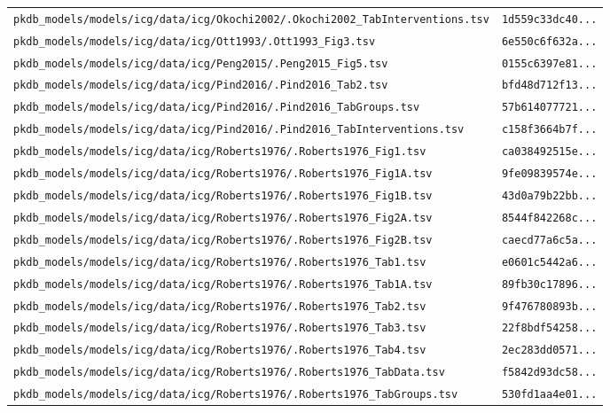 \begin{longtable}{ll}
\texttt{pkdb\_models/models/icg/data/icg/Okochi2002/.Okochi2002\_TabInterventions.tsv} & \texttt{1d559c33dc40...} \\
\texttt{pkdb\_models/models/icg/data/icg/Ott1993/.Ott1993\_Fig3.tsv} & \texttt{6e550c6f632a...} \\
\texttt{pkdb\_models/models/icg/data/icg/Peng2015/.Peng2015\_Fig5.tsv} & \texttt{0155c6397e81...} \\
\texttt{pkdb\_models/models/icg/data/icg/Pind2016/.Pind2016\_Tab2.tsv} & \texttt{bfd48d712f13...} \\
\texttt{pkdb\_models/models/icg/data/icg/Pind2016/.Pind2016\_TabGroups.tsv} & \texttt{57b614077721...} \\
\texttt{pkdb\_models/models/icg/data/icg/Pind2016/.Pind2016\_TabInterventions.tsv} & \texttt{c158f3664b7f...} \\
\texttt{pkdb\_models/models/icg/data/icg/Roberts1976/.Roberts1976\_Fig1.tsv} & \texttt{ca038492515e...} \\
\texttt{pkdb\_models/models/icg/data/icg/Roberts1976/.Roberts1976\_Fig1A.tsv} & \texttt{9fe09839574e...} \\
\texttt{pkdb\_models/models/icg/data/icg/Roberts1976/.Roberts1976\_Fig1B.tsv} & \texttt{43d0a79b22bb...} \\
\texttt{pkdb\_models/models/icg/data/icg/Roberts1976/.Roberts1976\_Fig2A.tsv} & \texttt{8544f842268c...} \\
\texttt{pkdb\_models/models/icg/data/icg/Roberts1976/.Roberts1976\_Fig2B.tsv} & \texttt{caecd77a6c5a...} \\
\texttt{pkdb\_models/models/icg/data/icg/Roberts1976/.Roberts1976\_Tab1.tsv} & \texttt{e0601c5442a6...} \\
\texttt{pkdb\_models/models/icg/data/icg/Roberts1976/.Roberts1976\_Tab1A.tsv} & \texttt{89fb30c17896...} \\
\texttt{pkdb\_models/models/icg/data/icg/Roberts1976/.Roberts1976\_Tab2.tsv} & \texttt{9f476780893b...} \\
\texttt{pkdb\_models/models/icg/data/icg/Roberts1976/.Roberts1976\_Tab3.tsv} & \texttt{22f8bdf54258...} \\
\texttt{pkdb\_models/models/icg/data/icg/Roberts1976/.Roberts1976\_Tab4.tsv} & \texttt{2ec283dd0571...} \\
\texttt{pkdb\_models/models/icg/data/icg/Roberts1976/.Roberts1976\_TabData.tsv} & \texttt{f5842d93dc58...} \\
\texttt{pkdb\_models/models/icg/data/icg/Roberts1976/.Roberts1976\_TabGroups.tsv} & \texttt{530fd1aa4e01...} \\

\end{longtable}
